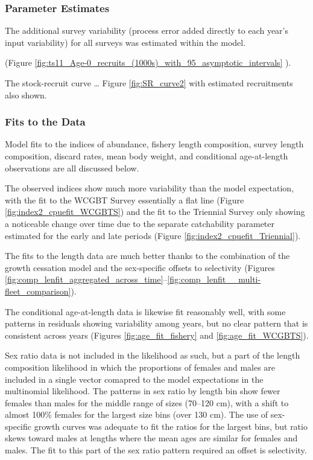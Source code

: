 \documentclass[12pt,]{article}
\begin{document}
\hypertarget{parameter-estimates}{%
\subsubsection{Parameter Estimates}\label{parameter-estimates}}

The additional survey variability (process error added directly to each
year's input variability) for all surveys was estimated within the
model.

(Figure
\ref{fig:ts11_Age-0_recruits_(1000s)_with_95_asymptotic_intervals} ).

The stock-recruit curve \ldots{} Figure \ref{fig:SR_curve2} with
estimated recruitments also shown.

\hypertarget{fits-to-the-data}{%
\subsubsection{Fits to the Data}\label{fits-to-the-data}}

Model fits to the indices of abundance, fishery length composition,
survey length composition, discard rates, mean body weight, and
conditional age-at-length observations are all discussed below.

The observed indices show much more variability than the model
expectation, with the fit to the WCGBT Survey essentially a flat line
(Figure \ref{fig:index2_cpuefit_WCGBTS}) and the fit to the Triennial
Survey only showing a noticeable change over time due to the separate
catchability parameter estimated for the early and late periods (Figure
\ref{fig:index2_cpuefit_Triennial}).

The fits to the length data are much better thanks to the combination of
the growth cessation model and the sex-specific offsets to selectivity
(Figures
\ref{fig:comp_lenfit_aggregated_across_time}--\ref{fig:comp_lenfit__multi-fleet_comparison}).

The conditional age-at-length data is likewise fit reasonably well, with
some patterns in residuals showing variability among years, but no clear
pattern that is consistent across years (Figures
\ref{fig:age_fit_fishery} and \ref{fig:age_fit_WCGBTS}).

Sex ratio data is not included in the likelihood as such, but a part of
the length composition likelihood in which the proportions of females
and males are included in a single vector comapred to the model
expectations in the multinomial likelihood. The patterns in sex ratio by
length bin show fewer females than males for the middle range of sizes
(70--120 cm), with a shift to almost 100\% females for the largest size
bins (over 130 cm). The use of sex-specific growth curves was adequate
to fit the ratios for the largest bins, but ratio skews toward males at
lengths where the mean ages are similar for females and males. The fit
to this part of the sex ratio pattern required an offset is selectivity.
\end{document}
